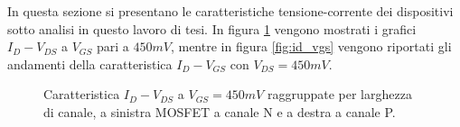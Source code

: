 In questa sezione si presentano le caratteristiche tensione-corrente dei dispositivi sotto analisi in questo lavoro di tesi.
In figura \ref{fig:id_vds} vengono mostrati i grafici $I_{D} - V_{DS}$ a $V_{GS}$ pari a $450mV$, mentre in figura \ref{fig:id_vgs} vengono riportati gli andamenti della caratteristica $I_D - V_{GS}$ con $V_{DS} = 450mV$.


\begin{figure}[ht]
    \centering
  
    \caption[Caratteristica $I_D - V_{DS}$ NMOS e PMOS]{Caratteristica $I_D - V_{DS}$ a $V_{GS} = 450mV$ raggruppate per larghezza di canale, a sinistra MOSFET a canale N e a destra a canale P.}
    \label{fig:id_vds}
  \end{figure}



